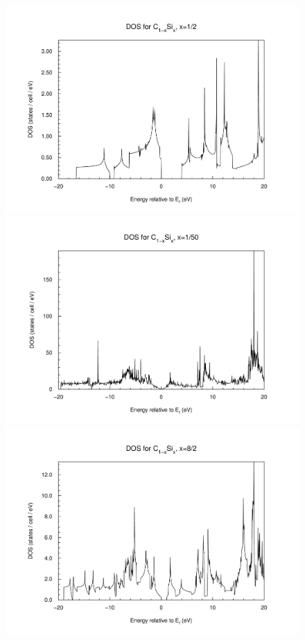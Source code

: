 				\begin{figure}
					\begin{minipage}[t]{0.9\textwidth}
						\includegraphics[width=\textwidth]{Results/Silicon/Silicon1/silicon1dos.pdf}
					\end{minipage}
					\begin{minipage}[t]{0.9\textwidth}
						\includegraphics[width=\textwidth]{Results/Silicon/Silicon5/silicon5dos.pdf}
					\end{minipage}
					\begin{minipage}[t]{0.3\textwidth}
						\includegraphics[width=\textwidth]{Results/Silicon/Silicon2/silicon2dos.pdf}

\end{minipage}
\end{figure}
